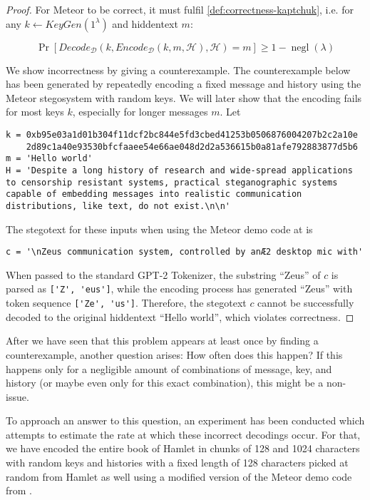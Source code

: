 \begin{proof}
For Meteor to be correct, it must fulfil \autoref{def:correctness-kaptchuk}, i.e. for any $k \leftarrow KeyGen(1^\lambda)$ and hiddentext $m$:

$$\mathop{Pr}[Decode_{\mathcal{D}}(k, Encode_{\mathcal{D}}(k, m, \mathcal{H}), \mathcal{H}) = m] \geq 1 - \mathop{negl}(\lambda)$$

We show incorrectness by giving a counterexample. 
The counterexample below has been generated by repeatedly encoding a fixed message and history using the Meteor stegosystem with random keys.
We will later show that the encoding fails for most keys $k$, especially for longer messages $m$.
Let

\begin{lstlisting}[breaklines]
k = 0xb95e03a1d01b304f11dcf2bc844e5fd3cbed41253b0506876004207b2c2a10e
    2d89c1a40e93530bfcfaaee54e66ae048d2d2a536615b0a81afe792883877d5b6
m = 'Hello world'
H = 'Despite a long history of research and wide-spread applications to censorship resistant systems, practical steganographic systems capable of embedding messages into realistic communication distributions, like text, do not exist.\n\n'
\end{lstlisting}

The stegotext for these inputs when using the Meteor demo code at \cite{MeteorDemo2021} is

\begin{lstlisting}
c = '\nZeus communication system, controlled by anÆ2 desktop mic with'
\end{lstlisting}

When passed to the standard GPT-2 Tokenizer, the substring ``Zeus'' of $c$ is parsed as \lstinline{['Z', 'eus']}, while the encoding process has generated ``Zeus'' with token sequence \lstinline{['Ze', 'us']}.
Therefore, the stegotext $c$ cannot be successfully decoded to the original hiddentext ``Hello world'', which violates correctness.
\end{proof}

After we have seen that this problem appears at least once by finding a counterexample, another question arises:
How often does this happen?
If this happens only for a negligible amount of combinations of message, key, and history (or maybe even only for this exact combination), this might be a non-issue.

To approach an answer to this question, an experiment has been conducted which attempts to estimate the rate at which these incorrect decodings occur.
For that, we have encoded the entire book of Hamlet in chunks of 128 and 1024 characters with random keys and histories with a fixed length of 128 characters picked at random from Hamlet as well using a modified version of the Meteor demo code from \cite{MeteorDemo2021}.


